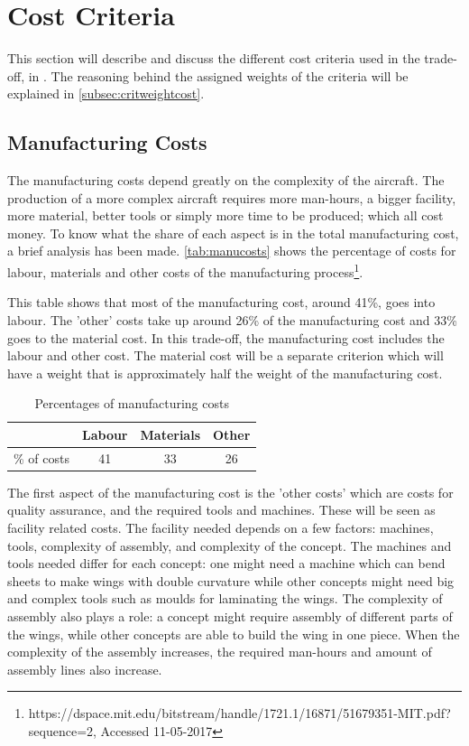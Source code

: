 \section{Cost Criteria}
\label{sec:costcrit}
This section will describe and discuss the different cost criteria used in the trade-off, in . The reasoning behind the assigned weights of the criteria will be explained in \autoref{subsec:critweightcost}. 

\subsection{Manufacturing Costs} 
\label{sec:mancost}
The manufacturing costs depend greatly on the complexity of the aircraft. The production of a more complex aircraft requires more man-hours, a bigger facility, more material, better tools or simply more time to be produced; which all cost money. To know what the share of each aspect is in the total manufacturing cost, a brief analysis has been made. \autoref{tab:manucosts} shows the percentage of costs for labour, materials and other costs of the manufacturing process\footnote{https://dspace.mit.edu/bitstream/handle/1721.1/16871/51679351-MIT.pdf?sequence=2, Accessed 11-05-2017}.


This table shows that most of the manufacturing cost, around 41\%, goes into labour. The 'other' costs take up around 26\% of the manufacturing cost and 33\% goes to the material cost. In this trade-off, the manufacturing cost includes the labour and other cost. The material cost will be a separate criterion which will have a weight that is approximately half the weight of the manufacturing cost. 

\begin{table}[H]
    \centering
    \caption{Percentages of manufacturing costs}
    \begin{tabular}{cccc}
    \toprule
         & Labour & Materials & Other \\ \midrule
    \% of costs     & 41 & 33 & 26 \\
    \bottomrule
    \end{tabular}
    \label{tab:manucosts}
\end{table}

The first aspect of the manufacturing cost is the 'other costs' which are costs for quality assurance, and the required tools and machines. These will be seen as facility related costs. The facility needed depends on a few factors: machines, tools, complexity of assembly, and complexity of the concept. The machines and tools needed differ for each concept: one might need a machine which can bend sheets to make wings with double curvature while other concepts might need big and complex tools such as moulds for laminating the wings. The complexity of assembly also plays a role: a concept might require assembly of different parts of the wings, while other concepts are able to build the wing in one piece. When the complexity of the assembly increases, the required man-hours  and amount of assembly lines also increase.

